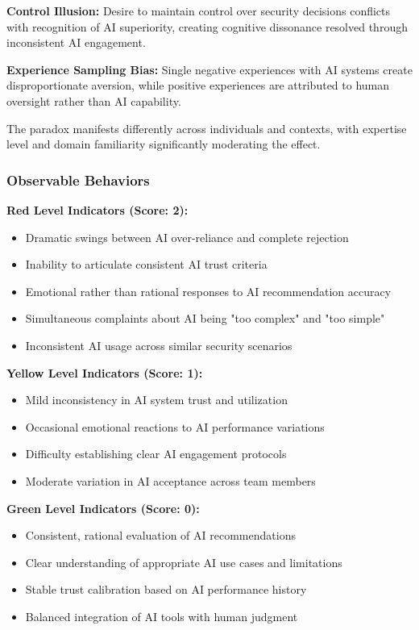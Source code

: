 \documentclass[11pt,a4paper]{article}
\begin{document}
\textbf{Control Illusion:} Desire to maintain control over security decisions conflicts with recognition of AI superiority, creating cognitive dissonance resolved through inconsistent AI engagement\cite{dietvorst2015}.

\textbf{Experience Sampling Bias:} Single negative experiences with AI systems create disproportionate aversion, while positive experiences are attributed to human oversight rather than AI capability\cite{mahmud2022}.

The paradox manifests differently across individuals and contexts, with expertise level and domain familiarity significantly moderating the effect\cite{logg2019}.

\subsubsection{Observable Behaviors}

\textbf{Red Level Indicators (Score: 2):}
\begin{itemize}
\item Dramatic swings between AI over-reliance and complete rejection
\item Inability to articulate consistent AI trust criteria
\item Emotional rather than rational responses to AI recommendation accuracy
\item Simultaneous complaints about AI being "too complex" and "too simple"
\item Inconsistent AI usage across similar security scenarios
\end{itemize}

\textbf{Yellow Level Indicators (Score: 1):}
\begin{itemize}
\item Mild inconsistency in AI system trust and utilization
\item Occasional emotional reactions to AI performance variations
\item Difficulty establishing clear AI engagement protocols
\item Moderate variation in AI acceptance across team members
\end{itemize}

\textbf{Green Level Indicators (Score: 0):}
\begin{itemize}
\item Consistent, rational evaluation of AI recommendations
\item Clear understanding of appropriate AI use cases and limitations
\item Stable trust calibration based on AI performance history
\item Balanced integration of AI tools with human judgment
\end{itemize}
\end{document}

